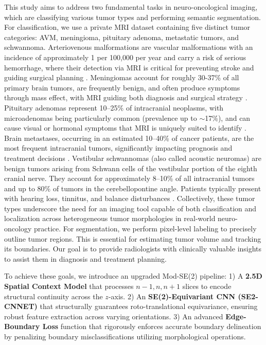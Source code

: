 \documentclass[10pt,twocolumn,letterpaper]{article}
\begin{document}
This study aims to address two fundamental tasks in neuro-oncological imaging, which are classifying various tumor types and performing semantic segmentation. For classification, we use a private MRI dataset containing five distinct tumor categories: AVM, meningioma, pituitary adenoma, metastatic tumors, and schwannoma. Arteriovenous malformations are vascular malformations with an incidence of approximately 1 per 100,000 per year and carry a risk of serious hemorrhage, where their detection via MRI is critical for preventing stroke and guiding surgical planning \cite{30,31}. Meningiomas account for roughly 30-37\% of all primary brain tumors, are frequently benign, and often produce symptoms through mass effect, with MRI guiding both diagnosis and surgical strategy \cite{32}. Pituitary adenomas represent 10–25\% of intracranial neoplasms, with microadenomas being particularly common (prevalence up to $\sim$17\%), and can cause visual or hormonal symptoms that MRI is uniquely suited to identify \cite{33}. Brain metastases, occurring in an estimated 10–40\% of cancer patients, are the most frequent intracranial tumors, significantly impacting prognosis and treatment decisions \cite{34}. Vestibular schwannomas (also called acoustic neuromas) are benign tumors arising from Schwann cells of the vestibular portion of the eighth cranial nerve. They account for approximately 8–10\% of all intracranial tumors and up to 80\% of tumors in the cerebellopontine angle. Patients typically present with hearing loss, tinnitus, and balance disturbances \cite{35}. Collectively, these tumor types underscore the need for an imaging tool capable of both classification and localization across heterogeneous tumor morphologies in real-world neuro-oncology practice. For segmentation, we perform pixel-level labeling to precisely outline tumor regions. This is essential for estimating tumor volume and tracking its boundaries. Our goal is to provide radiologists with clinically valuable insights to assist them in diagnosis and treatment planning.

To achieve these goals, we introduce an upgraded Mod-SE(2) pipeline:
1) A \textbf{2.5D Spatial Context Model} that processes $n-1, n, n+1$ slices to encode structural continuity across the $z$-axis.
2) An \textbf{SE(2)-Equivariant CNN (SE2-CNNET)} that structurally guarantees roto-translational equivariance, ensuring robust feature extraction across varying orientations.
3) An advanced \textbf{Edge-Boundary Loss} function that rigorously enforces accurate boundary delineation by penalizing boundary misclassifications utilizing morphological operations.
\end{document}
